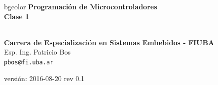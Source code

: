 \documentclass[aspectratio=169]{beamer}
\begin{document}

\begingroup
\makeatletter
\setlength{\hoffset}{-.5\beamer@sidebarwidth}
\makeatother
\begin{frame}
\begin{center}
\hfill
    \begin{beamercolorbox}[center,dp=3ex,ht=10.25ex, wd=1\linewidth]{bgcolor}
        \Large\textbf{Programación de Microcontroladores}\\
        \vspace{5px}
        \Large\textbf{Clase 1}
    \end{beamercolorbox}
\hfill\hfill
\\
\vspace{5px}
\textbf{Carrera de Especialización en Sistemas Embebidos - FIUBA}\\
\vspace{10px}
Esp. Ing. Patricio Bos\\ 
\texttt{pbos@fi.uba.ar}\\


\vspace{10px}


\vspace{5px}
\vfill
\tiny versión: 2016-08-20 rev 0.1 
 	  	
\end{center}
\end{frame}
\endgroup
\end{document}
